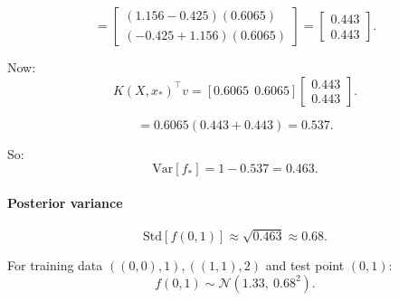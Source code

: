 $$
= \begin{bmatrix}
(1.156 - 0.425)(0.6065) \\
(-0.425 + 1.156)(0.6065)
\end{bmatrix}
=
\begin{bmatrix}
0.443 \\
0.443
\end{bmatrix}.
$$

Now:
$$
K(X,x_*)^\top v = [0.6065 \ \ 0.6065] \begin{bmatrix}0.443 \\ 0.443\end{bmatrix}.
$$

$$
= 0.6065(0.443+0.443) = 0.537.
$$

So:
$$
\text{Var}[f_*] = 1 - 0.537 = 0.463.
$$

\paragraph{Posterior variance}
$$
\text{Std}[f(0,1)] \approx \sqrt{0.463} \approx 0.68.
$$

For training data $((0,0),1), ((1,1),2)$ and test point $(0,1)$:
$$
f(0,1) \sim \mathcal{N}(1.33, \ 0.68^2).
$$

